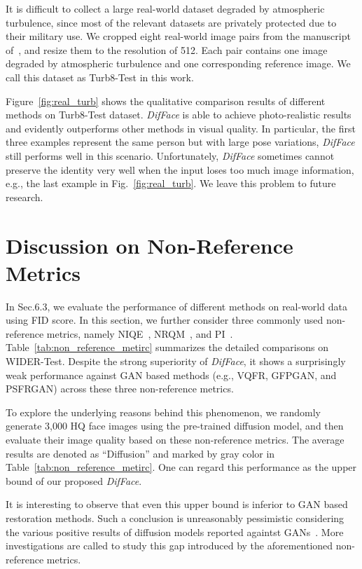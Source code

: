 \documentclass[10pt,twocolumn,letterpaper]{article}
\begin{document}
It is difficult to collect a large real-world dataset degraded by atmospheric turbulence, since most of the relevant datasets are privately protected due to their military use. We cropped eight real-world image pairs from the manuscript of~\cite{DBLP:journals/corr/abs-2112-02379}, and resize them to the resolution of 512. Each pair contains one image degraded by atmospheric turbulence and one corresponding reference image. We call this dataset as Turb8-Test in this work.

Figure~\ref{fig:real_turb} shows the qualitative comparison results of different methods on Turb8-Test dataset. \textit{DifFace} is able to achieve photo-realistic results and evidently outperforms other methods in visual quality. In particular, the first three examples represent the same person but with large pose variations, \textit{DifFace} still performs well in this scenario. Unfortunately, \textit{DifFace} sometimes cannot preserve the identity very well when the input loses too much image information, e.g., the last example in Fig.~\ref{fig:real_turb}. We leave this problem to future research.

\section{Discussion on Non-Reference Metrics}\label{sec:non_refer_supp}
In Sec.6.3, we evaluate the performance of different methods on real-world data using FID score. In this section, we further consider three commonly used non-reference metrics, namely NIQE~\cite{mittal2012making}, NRQM~\cite{ma2017learning}, and PI~\cite{blau20182018}.
Table~\ref{tab:non_reference_metirc} summarizes the detailed comparisons on WIDER-Test. Despite the strong superiority of \textit{DifFace}, it shows a surprisingly weak performance against GAN based methods (e.g., VQFR, GFPGAN, and PSFRGAN) across these three non-reference metrics.

To explore the underlying reasons behind this phenomenon, we randomly generate 3,000 HQ face images using the pre-trained diffusion model, and then evaluate their image quality based on these non-reference metrics. The average results are denoted as ``Diffusion'' and marked by \textcolor[gray]{0.5}{gray} color in Table~\ref{tab:non_reference_metirc}. One can regard this performance as the upper bound of our proposed \textit{DifFace}.

It is interesting to observe that even this upper bound is inferior to GAN based restoration methods. Such a conclusion is unreasonably pessimistic considering the various positive results of diffusion models reported againtst GANs~\cite{song2020score,dhariwal2021diffusion}. More investigations are called to study this gap introduced by the aforementioned non-reference metrics.
\end{document}
